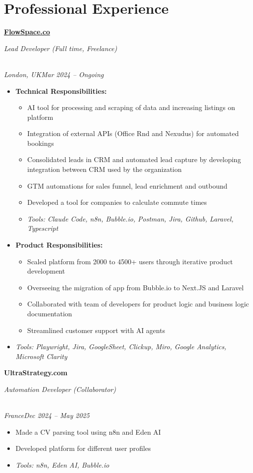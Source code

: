 \documentclass[a4paper,10pt]{article}
\newcommand{\role}[4]{\vspace{3pt}\noindent\hspace{0.6em}\parbox[t]{0.38\textwidth}{\raggedright\textbf{#1}}\hfill\parbox[t]{0.58\textwidth}{\raggedleft\textit{#2}}\\{\textit{#3}\hfill\textit{#4}}\vspace{1pt}}
\begin{document}
\section{Professional Experience}
\role{\href{https://flowspace.co}{FlowSpace.co}}{Lead Developer (Full time, Freelance)}{London, UK}{Mar 2024 -- Ongoing}
\begin{itemize}
\item \textbf{Technical Responsibilities:}
\begin{itemize}[label=--]
\item AI tool for processing and scraping of data and increasing listings on platform
\item Integration of external APIs (Office Rnd and Nexudus) for automated bookings
\item Consolidated leads in CRM and automated lead capture by developing integration between CRM used by the organization
\item GTM automations for sales funnel, lead enrichment and outbound
\item Developed a tool for companies to calculate commute times
\item \textit{Tools: Claude Code, n8n, Bubble.io, Postman, Jira, Github, Laravel, Typescript}
\end{itemize}
\item \textbf{Product Responsibilities:}
\begin{itemize}[label=--]
\item Scaled platform from 2000 to 4500+ users through iterative product development
\item Overseeing the migration of app from Bubble.io to Next.JS and Laravel
\item Collaborated with team of developers for product logic and business logic documentation
\item Streamlined customer support with AI agents
\end{itemize}
\item \textit{Tools: Playwright, Jira, GoogleSheet, Clickup, Miro, Google Analytics, Microsoft Clarity}
\end{itemize}

\role{UltraStrategy.com}{Automation Developer (Collaborator)}{France}{Dec 2024 -- May 2025}
\begin{itemize}
\item Made a CV parsing tool using n8n and Eden AI
\item Developed platform for different user profiles
\item \textit{Tools: n8n, Eden AI, Bubble.io}
\end{itemize}
\end{document}

